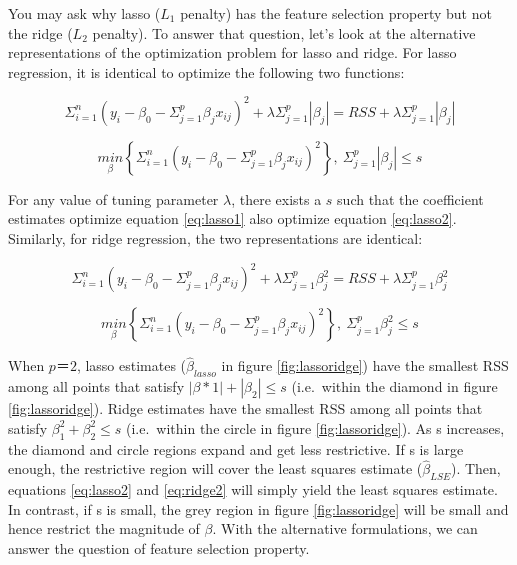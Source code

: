 \documentclass[12pt,]{krantz}
\begin{document}
You may ask why lasso (\(L_1\) penalty) has the feature selection property but not the ridge (\(L_2\) penalty). To answer that question, let's look at the alternative representations of the optimization problem for lasso and ridge. For lasso regression, it is identical to optimize the following two functions:

\begin{equation}
\Sigma_{i=1}^{n}(y_{i}-\beta_{0}-\Sigma_{j=1}^{p}\beta_{j}x_{ij})^{2}+\lambda\Sigma_{j=1}^{p}|\beta_{j}|=RSS+\lambda\Sigma_{j=1}^{p}|\beta_{j}|
\label{eq:lasso1}
\end{equation}

\begin{equation}
\underset{\beta}{min}\left\{ \Sigma_{i=1}^{n}\left(y_{i}-\beta_{0}-\Sigma_{j=1}^{p}\beta_{j}x_{ij}\right)^{2}\right\} ,\ \Sigma_{j=1}^{p}|\beta_{j}|\leq s
\label{eq:lasso2}
\end{equation}

For any value of tuning parameter \(\lambda\), there exists a \(s\) such that the coefficient estimates optimize equation \eqref{eq:lasso1} also optimize equation \eqref{eq:lasso2}. Similarly, for ridge regression, the two representations are identical:

\begin{equation}
\Sigma_{i=1}^{n}(y_{i}-\beta_{0}-\Sigma_{j=1}^{p}\beta_{j}x_{ij})^{2}+\lambda\Sigma_{j=1}^{p}\beta_{j}^{2}=RSS+\lambda\Sigma_{j=1}^{p}\beta_{j}^{2}
\label{eq:ridge1}
\end{equation}

\begin{equation}
\underset{\beta}{min}\left\{ \Sigma_{i=1}^{n}\left(y_{i}-\beta_{0}-\Sigma_{j=1}^{p}\beta_{j}x_{ij}\right)^{2}\right\} ,\ \Sigma_{j=1}^{p}\beta_{j}^{2}\leq s
\label{eq:ridge2}
\end{equation}

When \(p＝2\), lasso estimates (\(\hat{\beta}_{lasso}\) in figure \ref{fig:lassoridge}) have the smallest RSS among all points that satisfy \(|\beta*{1}|+|\beta_{2}|\leq s\) (i.e.~within the diamond in figure \ref{fig:lassoridge}). Ridge estimates have the smallest RSS among all points that satisfy \(\beta_{1}^{2}+\beta_{2}^{2}\leq s\) (i.e.~within the circle in figure \ref{fig:lassoridge}). As s increases, the diamond and circle regions expand and get less restrictive. If s is large enough, the restrictive region will cover the least squares estimate (\(\hat{\beta}_{LSE}\)). Then, equations \eqref{eq:lasso2} and \eqref{eq:ridge2} will simply yield the least squares estimate. In contrast, if s is small, the grey region in figure \ref{fig:lassoridge} will be small and hence restrict the magnitude of \(\beta\). With the alternative formulations, we can answer the question of feature selection property.
\end{document}
